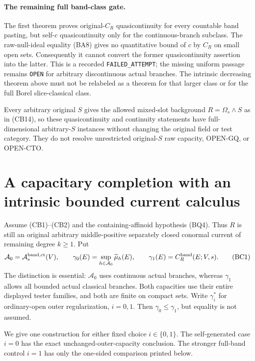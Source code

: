 \documentclass[11pt,a4paper]{article}
\numberwithin{equation}{section}
\theoremstyle{definition}
\theoremstyle{remark}
\begin{document}
\paragraph{The remaining full band-class gate.}
The first theorem proves original-$C_R$ quasicontinuity for
every countable band pasting, but self-$c$ quasicontinuity only
for the continuous-branch subclass. The raw-null-ideal equality
(BA8) gives no quantitative bound of $c$ by $C_R$ on small
open sets. Consequently it cannot convert the former
quasicontinuity assertion into the latter. This is a recorded
\texttt{FAILED\_ATTEMPT}; the missing uniform passage remains
\texttt{OPEN} for arbitrary discontinuous actual branches.
The intrinsic decreasing theorem above must not be relabeled
as a theorem for that larger class or for the full Borel
slice-classical class.

Every arbitrary original $S$ gives the allowed mixed-slot
background $R=\Omega_s\wedge S$ as in (CB14), so these
quasicontinuity and continuity statements have full-dimensional
arbitrary-$S$ instances without changing the original field or
test category. They do not resolve unrestricted original-$S$
raw capacity, OPEN-GQ, or OPEN-CTO.



\section{A capacitary completion with an intrinsic bounded current calculus}
\label{sec:r12-band-capacitary-completion}

Assume (CB1)--(CB2) and the containing-affinoid hypothesis
(BQ4). Thus $R$ is still an original arbitrary middle-positive
separately closed conormal current of remaining degree $k\geq1$.
Put
\[
 \mathcal A_0=\mathcal A_s^{\rm band,ct}(V),\qquad
 \gamma_0(E)=\sup_{h\in\mathcal A_0}\widetilde\mu_h(E),\qquad
 \gamma_1(E)=C_R^{\rm band}(E;V,s).
 \tag{BC1}
\]
The distinction is essential: $\mathcal A_0$ uses continuous
actual branches, whereas $\gamma_1$ allows all bounded actual
classical branches. Both capacities use their entire displayed
tester families, and both are finite on compact sets. Write
$\gamma_i^*$ for ordinary-open outer regularization, $i=0,1$.
Then $\gamma_0\leq\gamma_1$, but equality is not assumed.

We give one construction for either fixed choice $i\in\{0,1\}$.
The self-generated case $i=0$ has the exact unchanged-outer-capacity
conclusion. The stronger full-band control $i=1$ has only the
one-sided comparison printed below.
\end{document}
